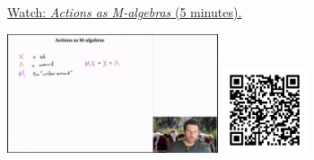 
\begin{minipage}{10cm}
    \href{https://act4e-spring21.netlify.app/videos/spring2021-monads-b:actions-as-algebras.html}{Watch: \emph{Actions as M-algebras} (5 minutes).}
        
    \href{https://act4e-spring21.netlify.app/videos/spring2021-monads-b:actions-as-algebras.html}{\includegraphics[height=3.5cm]{spring2021-monads-b:actions-as-algebras/thumbnails.jpg}}
    \href{https://act4e-spring21.netlify.app/videos/spring2021-monads-b:actions-as-algebras.html}{\includegraphics[height=2.5cm]{spring2021-monads-b:actions-as-algebras/qrcode.png}}
\end{minipage}
